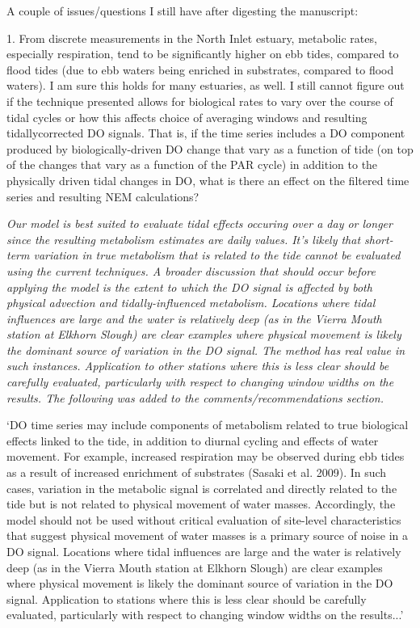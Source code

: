 \documentclass[letterpaper,12pt]{article}\usepackage[]{graphicx}\usepackage[]{color}
\begin{document}
A couple of issues/questions I still have after digesting the manuscript:

1. From discrete measurements in the North Inlet estuary, metabolic rates, especially respiration, tend to be significantly higher on ebb tides, compared to flood tides (due to ebb waters being enriched in substrates, compared to flood waters). I am sure this holds for many estuaries, as well. I still cannot figure out if the technique presented allows for biological rates to vary over the course of tidal cycles or how this affects choice of averaging windows and resulting tidallycorrected DO signals. That is, if the time series includes a DO component produced by biologically-driven DO change that vary as a function of tide (on top of the changes that vary as a function of the PAR cycle) in addition to the physically driven tidal changes in DO, what is there an effect on the filtered time series and resulting NEM calculations?

{\it Our model is best suited to evaluate tidal effects occuring over a day or longer since the resulting metabolism estimates are daily values. It's likely that short-term variation in true metabolism that is related to the tide cannot be evaluated using the current techniques.  A broader discussion that should occur before applying the model is the extent to which the DO signal is affected by both physical advection and tidally-influenced metabolism.  Locations where tidal influences are large and the water is relatively deep (as in the Vierra Mouth station at Elkhorn Slough) are clear examples where physical movement is likely the dominant source of variation in the DO signal.  The method has real value in such instances.  Application to other stations where this is less clear should be carefully evaluated, particularly with respect to changing window widths on the results.  The following was added to the comments/recommendations section.

`DO time series may include components of metabolism related to true biological effects linked to the tide, in addition to diurnal cycling and effects of water movement.  For example, increased respiration may be observed during ebb tides as a result of increased enrichment of substrates (Sasaki et al. 2009).  In such cases, variation in the metabolic signal is correlated and directly related to the tide but is not related to physical movement of water masses. Accordingly, the model should not be used without critical evaluation of site-level characteristics that suggest physical movement of water masses is a primary source of noise in a DO signal.  Locations where tidal influences are large and the water is relatively deep (as in the Vierra Mouth station at Elkhorn Slough) are clear examples where physical movement is likely the dominant source of variation in the DO signal.  Application to stations where this is less clear should be carefully evaluated, particularly with respect to changing window widths on the results...' 

}
\end{document}
